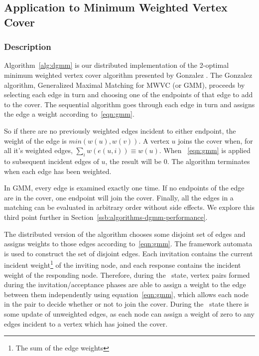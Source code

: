 \documentclass[article, 10pt, letter]{IEEEtran}
\begin{document}


\subsection{Application to Minimum Weighted Vertex Cover}
\label{sub:algorithms-dgmm}
\subsubsection{Description}
\label{ssb:algorithms-dgmm-description}

Algorithm~\ref{alg:dgmm} is our distributed implementation of the 2-optimal minimum weighted vertex cover algorithm presented by Gonzalez \cite{Gonzalez1995129}. The Gonzalez algorithm, Generalized Maximal Matching for MWVC (or GMM), proceeds by selecting each edge in turn and choosing one of the endpoints of that edge to add to the cover. The sequential algorithm goes through each edge in turn and assigns the edge a weight according to~\eqref{eqn:gmm}.



So if there are no previously weighted edges incident to either endpoint, the weight of the edge is $min(w(u),w(v))$. A vertex $u$ joins the cover when, for all it's weighted edges, $\sum_i w(e(u,i)) \equiv w(u)$. When ~\eqref{eqn:gmm} is applied to subsequent incident edges of $u$, the result will be 0. The algorithm terminates when each edge has been weighted. 

In GMM, every edge is examined exactly one time. If no endpoints of the edge are in the cover, one endpoint will join the cover. Finally, all the edges in a matching can be evaluated in arbitrary order without side effects. We explore this third point further in Section~\ref{ssb:algorithms-dgmm-performance}. 

The distributed version of the algorithm chooses some disjoint set of edges and assigns weights to those edges according to~\eqref{eqn:gmm}. The framework automata is used to construct the set of disjoint edges. Each invitation contains the current incident weight\footnote{The sum of the edge weights} of the inviting node, and each response contains the incident weight of the responding node. Therefore, during the \cUd\ state, vertex pairs formed during the invitation/acceptance phases are able to assign a weight to the edge between them independently using equation~\ref{eqn:gmm}, which allows each node in the pair to decide whether or not to join the cover. During the \cEd\ state there is some update of unweighted edges, as each node can assign a weight of zero to any edges incident to a vertex which has joined the cover.
\end{document}

